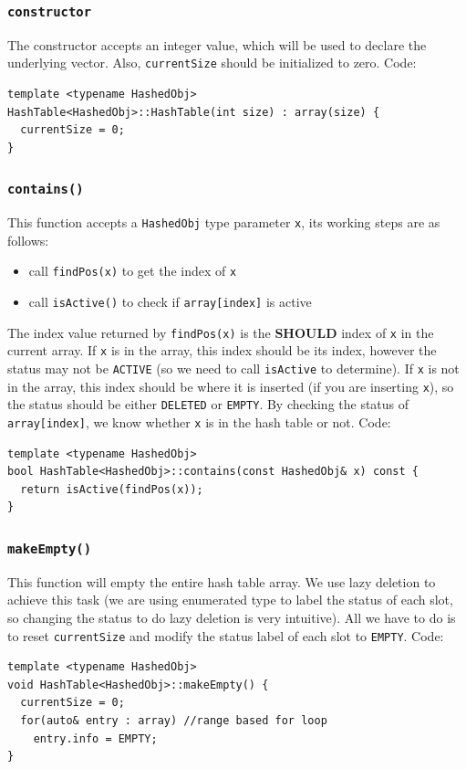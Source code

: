 \documentclass[11pt]{book}
\begin{document}
\subsubsection{\texttt{constructor}}
\label{sec:orgd61c538}
The constructor accepts an integer value, which will be used to declare the underlying vector. Also, \texttt{currentSize} should be initialized to zero. Code:
\begin{verbatim}
template <typename HashedObj>
HashTable<HashedObj>::HashTable(int size) : array(size) {
  currentSize = 0;
}
\end{verbatim}

\subsubsection{\texttt{contains()}}
\label{sec:orgfe03f4e}
This function accepts a \texttt{HashedObj} type parameter \texttt{x}, its working steps are as follows:
\begin{itemize}
\item call \texttt{findPos(x)} to get the index of \texttt{x}
\item call \texttt{isActive()} to check if \texttt{array[index]} is active
\end{itemize}

The index value returned by \texttt{findPos(x)} is the \textbf{SHOULD} index of \texttt{x} in the current array. If \texttt{x} is in the array, this index should be its index, however the status may not be \texttt{ACTIVE} (so we need to call \texttt{isActive} to determine). If \texttt{x} is not in the array, this index should be where it is inserted (if you are inserting \texttt{x}), so the status should be either \texttt{DELETED} or \texttt{EMPTY}. By checking the status of \texttt{array[index]}, we know whether \texttt{x} is in the hash table or not. Code:
\begin{verbatim}
template <typename HashedObj>
bool HashTable<HashedObj>::contains(const HashedObj& x) const {
  return isActive(findPos(x));
}
\end{verbatim}

\subsubsection{\texttt{makeEmpty()}}
\label{sec:org6e0733e}
This function will empty the entire hash table array. We use lazy deletion to achieve this task (we are using enumerated type to label the status of each slot, so changing the status to do lazy deletion is very intuitive). All we have to do is to reset \texttt{currentSize} and modify the status label of each slot to \texttt{EMPTY}. Code:
\begin{verbatim}
template <typename HashedObj>
void HashTable<HashedObj>::makeEmpty() {
  currentSize = 0;
  for(auto& entry : array) //range based for loop
    entry.info = EMPTY;
}
\end{verbatim}
\end{document}
